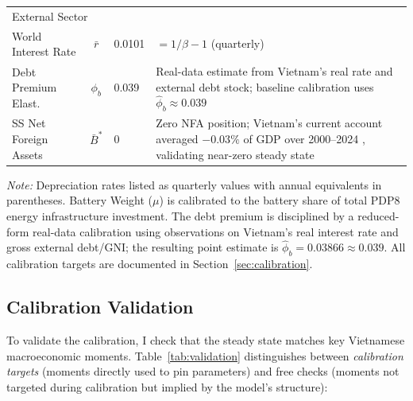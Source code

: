 \begin{table}[H]
\begin{tabular}{l c l p{6.5cm}}
			\midrule
			\multicolumn{4}{l}{External Sector} \\
			World Interest Rate & $\bar{r}$ & 0.0101 & $= 1/\beta - 1$ (quarterly) \\
			Debt Premium Elast. & $\phi_b$ & 0.039 & Real-data estimate from Vietnam's real rate and external debt stock; baseline calibration uses $\hat{\phi}_b \approx 0.039$ \\
			SS Net Foreign Assets & $\bar{B}^*$ & 0 & Zero NFA position; Vietnam's current account averaged $-0.03\%$ of GDP over 2000--2024 \citep{worldbank2024}, validating near-zero steady state \\
			\bottomrule
		\end{tabular}
		\vspace{0.2cm}
		\parbox{\textwidth}{\footnotesize \textit{Note:} Depreciation rates listed as quarterly values with annual equivalents in parentheses. Battery Weight ($\mu$) is calibrated to the battery share of total PDP8 energy infrastructure investment. The debt premium is disciplined by a reduced-form real-data calibration using \citep{worldbank2024} observations on Vietnam's real interest rate and gross external debt/GNI; the resulting point estimate is $\hat{\phi}_b = 0.03866 \approx 0.039$. All calibration targets are documented in Section~\ref{sec:calibration}.}
	\end{table}
	
	\subsection{Calibration Validation} \label{sec:calibration_validation}

	To validate the calibration, I check that the steady state matches key Vietnamese macroeconomic moments. Table~\ref{tab:validation} distinguishes between \textit{calibration targets} (moments directly used to pin parameters) and free checks (moments not targeted during calibration but implied by the model's structure):

